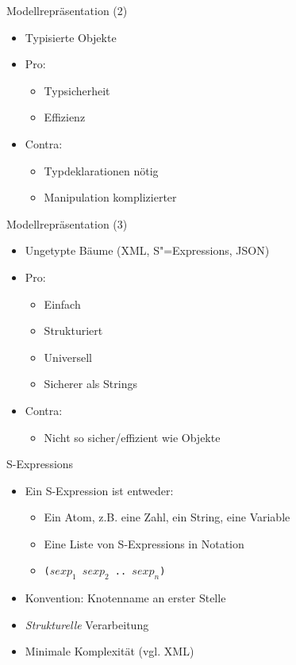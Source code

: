 \documentclass{beamer}
\newcommand{\sexps}{S"=Expressions}
\begin{document}
\begin{frame}{Modellrepräsentation (2)}
  \begin{itemize}
  \item Typisierte Objekte
  \item Pro:
    \begin{itemize}
    \item Typsicherheit
    \item Effizienz
    \end{itemize}
  \item Contra:
    \begin{itemize}
    \item Typdeklarationen nötig
    \item Manipulation komplizierter
    \end{itemize}
  \end{itemize} 
\end{frame}

\begin{frame}{Modellrepräsentation (3)}
  \begin{itemize}
  \item Ungetypte Bäume (XML, \sexps{}, JSON)
  \item Pro:
    \begin{itemize}
    \item Einfach
    \item Strukturiert
    \item Universell
    \item Sicherer als Strings
    \end{itemize}
  \item Contra:
    \begin{itemize}
    \item Nicht so sicher/effizient wie Objekte
    \end{itemize}
  \end{itemize} 
\end{frame}

\begin{frame}[fragile]{S-Expressions}
  \begin{itemize}
  \item Ein S-Expression ist entweder:
    \begin{itemize}
    \item Ein Atom, z.B. eine Zahl, ein String, eine Variable
    \item Eine Liste von S-Expressions in Notation 
    \item[] \texttt{($sexp_1$ $sexp_2$ .. $sexp_n$)}
    \end{itemize}
  \item Konvention: Knotenname an erster Stelle
  \item \textit{Strukturelle} Verarbeitung
  \item Minimale Komplexität (vgl. XML)
  \end{itemize}
\end{frame}
\end{document}
